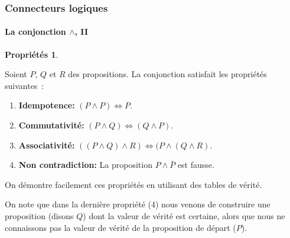 \documentclass[10pt,notheorems]{beamer}
\theoremstyle{plain}
\theoremstyle{definition} %
\newtheorem{properties}{Propriétés}
\begin{document}
\begin{frame}
  \frametitle{Connecteurs logiques}
  \framesubtitle{La conjonction $\land$, II}
  \hypertarget{slide_conjonction_2}{}

  \begin{properties}\label{properties:conjonction}

    Soient $P$, $Q$ et $R$ des propositions. La conjonction satisfait
    les propriétés suivantes~:
    \begin{enumerate}
    \item \textbf{Idempotence:} $(P \land P) \Leftrightarrow P$.
    \item \textbf{Commutativité:}
      $(P \land Q) \Leftrightarrow (Q \land P)$.
    \item \textbf{Associativité:}
      $((P \land Q)\land R) \Leftrightarrow (P \land (Q\land R)$.
    \item \textbf{Non contradiction:} La proposition $P \land \bar P$
      est fausse.
    \end{enumerate}
  \end{properties}

  \bigskip

  On démontre facilement ces propriétés en utilisant des tables de
  vérité.\newline

  On note que dans la dernière propriété (4) nous venons de construire
  une proposition (disons $Q$) dont la valeur de vérité est certaine,
  alors que nous ne connaissons pas la valeur de vérité de la
  proposition de départ ($P$).

\end{frame}
\end{document}
